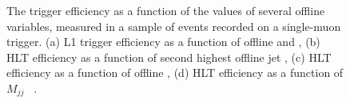 \begin{figure}
  \caption{The trigger efficiency as a function of the values of several offline variables, measured in a sample of events recorded on a single-muon trigger. (a) \ac{L1} trigger efficiency as a function of offline \MET and \METnoMU, (b) \ac{HLT} efficiency as a function of second highest offline jet \pt, (c) \ac{HLT} efficiency as a function of offline \MET, (d) \ac{HLT} efficiency as a function of $M_{jj}$~\cite{ARTICLE:CMSAN-12-403} .}
  \label{fig:prompttrigplots}
\end{figure}

